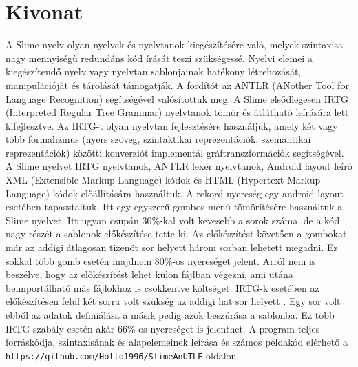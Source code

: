 \setcounter{page}{1}

\selecthungarian

\chapter*{Kivonat}

A Slime nyelv olyan nyelvek és nyelvtanok kiegészítésére való, melyek szintaxisa nagy mennyiségű redundáns kód írását teszi szükségessé. 
Nyelvi elemei a kiegészítendő nyelv vagy nyelvtan sablonjainak hatékony létrehozását, manipulációját és tárolását támogatják. 
A fordítót az ANTLR (ANother Tool for Language Recognition) segítségével valósítottuk meg. 
A Slime elsődlegesen IRTG (Interpreted Regular Tree Grammar) nyelvtanok tömör és átlátható leírására lett kifejlesztve. 
Az IRTG-t olyan nyelvtan fejlesztésére használjuk, amely két vagy több formalizmus (nyers szöveg, szintaktikai reprezentációk, szemantikai reprezentációk) közötti konverziót implementál gráftranszformációk segítségével. 
A Slime nyelvet IRTG nyelvtanok, ANTLR lexer nyelvtanok,  Android layout leíró XML (Extensible Markup Language) kódok és HTML (Hypertext Markup Language) kódok előállítására használtuk. 
A rekord nyereség egy android layout esetében tapasztaltuk.
Itt egy egyszerű gombos menü tömörítésére használtuk a Slime nyelvet.
Itt ugyan csupán 30\%-kal volt kevesebb a sorok száma, de a kód nagy részét a sablonok előkészítése tette ki.
Az előkészítést követően a gombokat már az addigi átlagosan tizenöt sor helyett három sorban lehetett megadni.
Ez sokkal több gomb esetén majdnem 80\%-os nyereséget jelent.
Arról nem is beszélve, hogy az előkészítést lehet külön fájlban végezni, ami utána beimportálható más fájlokhoz is csökkentve költséget.
IRTG-k esetében az előkészítésen felül két sorra volt szükség az addigi hat sor helyett .
Egy sor volt ebből az adatok definiálása a másik pedig azok beszúrása a sablonba.
Ez több IRTG szabály esetén akár 66\%-os nyereséget is jelenthet.
A program teljes forráskódja, szintaxisának és alapelemeinek leírása és számos példakód elérhető a \texttt{https://github.com/Hollo1996/SlimeAnUTLE} oldalon.

\vfill
\selectenglish


